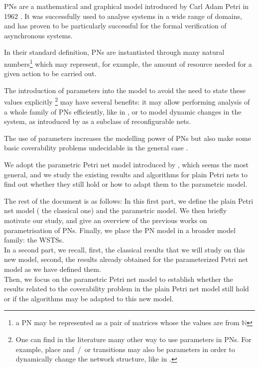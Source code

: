 \acp{PN} are a mathematical and graphical model introduced by Carl Adam Petri in 1962 \citep{Petri62,Petri66}. It was successfully used to analyse systems in a wide range of domains, and has proven to be particularly successful for the formal verification of asynchronous systems.

In their standard definition, \acp{PN} are instantiated through many natural numbers\footnote{ a \ac{PN} may be represented as a pair of matrices whose the values are from $\mathbb{N}$} which may represent, for example, the amount of resource needed for a given action to be carried out.

The introduction of parameters into the model to avoid the need to state these values explicitly%
\footnote{One can find in the literature many other way to use parameters in \acp{PN}. For example, place and~/~or transitions may also be parameters in order to dynamically change the network structure, like in \cite{Christensen97}.}
may have several benefits:
it may allow performing analysis of a whole family of \acp{PN} efficiently, like in \cite{Abdulla13}, or to model dynamic changes in the system, as introduced by \cite{Badouel99} as a subclass of reconfigurable nets.

The use of parameters increases the modelling power of \acp{PN} but also make some basic coverability problems undecidable in the general case \cite{David17}.

We adopt the parametric Petri net model introduced by \cite{David17}, which seems the most general, and we study the existing results and algorithms for plain Petri nets to find out whether they still hold or how to adapt them to the parametric model.

The rest of the document is as follows:
In this first part, we define the plain Petri net model ( the classical one) and the parametric model.
We then briefly motivate our study,  and give an overview of the previous works on parametrisation of \acp{PN}.
Finally, we place the \ac{PN} model in a broader model family: the \acp{WSTS}.\\
In a second part, we recall, first, the classical results that we will study on this new model, second, the results already obtained for the parameterized Petri net model as we have defined them.\\
Then, we focus on the parametric Petri net model to establish whether the results related to the coverability problem in the plain Petri net model still hold or if the algorithms may be adapted to this new model.

\acresetall

